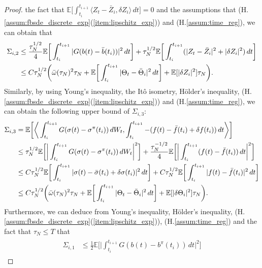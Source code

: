 \documentclass[11pt]{article}
\numberwithin{equation}{section}
\theoremstyle{definition}
\theoremstyle{remark}
\def\l{\label}  \def\f{\frac}  \def\fa{\forall}
\def \la{\langle} \def\ra{\rangle}
\def\sE{{\mathbb{E}}}
\begin{document}
\begin{proof}
the fact that 
$\sE \big[\int_{t_i}^{t_{i+1}} \la {Z}_t-\bar{Z}_i, \delta Z_i
\ra \,dt\big]=0$
and the assumptions that
(H.\ref{assum:fbsde_discrete_exp}(\ref{item:lipschitz_exp}))
and
(H.\ref{assum:time_reg}),  
we can obtain that
\begin{align}\l{eq:Sigma_i2_conts}
\begin{split}
\Sigma_{i,2}
&\le
\frac{\tau_N^{1/2}}{4}
\sE\bigg[
\int_{t_i}^{t_{i+1}}|G(b(t)-\bar{b}(t_i))|^2\,dt
\bigg]
+{\tau_N^{1/2}}
\sE\bigg[
\int_{t_i}^{t_{i+1}} (|{Z}_t-\bar{Z}_i|^2+|\delta Z_i|^2)\,d t
\bigg]
\\
&\le 
C\tau_N^{1/2}
\bigg(
\bar{\om}(\tau_N)^2\tau_N+
\sE
\bigg[
 \int_{t_i}^{t_{i+1}}
|\Theta_t-\bar{\Theta}_i|^2
 \,dt
 \bigg]
+\sE[|\delta Z_i|^2]\tau_N
\bigg).
\end{split}
\end{align}
Similarly,  
by using Young's inequality, the It\^{o} isometry,  H\"{o}lder's inequality,
 (H.\ref{assum:fbsde_discrete_exp}(\ref{item:lipschitz_exp}))
and
(H.\ref{assum:time_reg}),  
we can obtain the following upper bound of  $\Sigma_{i,3}$:
\begin{align}\l{eq:Sigma_i3_conts}
\begin{split}
\Sigma_{i,3}
&=
\sE\bigg[\bigg\la 
\int_{t_i}^{t_{i+1}}G(\sigma(t)-{\sigma}^\pi(t_i))\,d W_t,\int_{t_i}^{t_{i+1}}-(f(t)-\bar{f}(t_i)+\delta {f}(t_{i}))\,dt
\bigg\ra
\bigg]
\\
&\le
\tau_N^{1/2}\sE\bigg[\bigg| 
\int_{t_i}^{t_{i+1}}G(\sigma(t)-{\sigma}^\pi(t_i))\,d W_t\bigg|^2\bigg]
+\frac{\tau_N^{-1/2}}{4}
\sE\bigg[\bigg|\int_{t_i}^{t_{i+1}}(f(t)-\bar{f}(t_i))\,dt\bigg|^2
\bigg]
\\
&\le 
C\tau_N^{1/2}\sE\bigg[
\int_{t_i}^{t_{i+1}}|\sigma(t)-\bar{\sigma}(t_i)+\delta {\sigma}(t_i)|^2\,d t\bigg]
+C\tau_N^{1/2}
\sE\bigg[\int_{t_i}^{t_{i+1}}|f(t)-\bar{f}(t_i)|^2\,dt
\bigg]
\\
&\le 
C\tau_N^{1/2}
\bigg(
\bar{\om}(\tau_N)^2\tau_N+
\sE
\bigg[
 \int_{t_i}^{t_{i+1}}
|\Theta_t-\bar{\Theta}_i|^2
 \,dt
 \bigg]
+\sE[|\delta \Theta_i|^2]\tau_N
\bigg).
\end{split}
\end{align}
Furthermore,
we can deduce from  Young's inequality, H\"{o}lder's inequality,
 (H.\ref{assum:fbsde_discrete_exp}(\ref{item:lipschitz_exp})),
(H.\ref{assum:time_reg})
and the fact that $\tau_N\le T$
 that
\begin{align}\l{eq:Sigma_i1_conts}
\begin{split}
\Sigma_{i,1}
&\le
\frac{1}{2}
\sE\bigg[\bigg| 
\int_{t_i}^{t_{i+1}}G(b(t)-{b}^\pi(t_{i}))\,dt\bigg|^2\bigg]

\end{split}
\end{align}
\end{proof}
\end{document}
